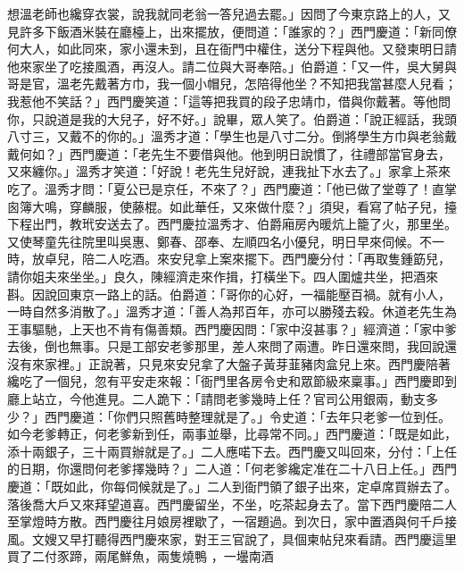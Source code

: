 想溫老師也纔穿衣裳，說我就同老翁一答兒過去罷。」因問了今東京路上的人，又見許多下飯酒米裝在廳檯上，出來擺放，便問道：「誰家的？」西門慶道：「新同僚何大人，如此同來，家小還未到，且在衙門中權住，送分下程與他。又發柬明日請他來家坐了吃接風酒，再沒人。請二位與大哥奉陪。」伯爵道：「又一件，吳大舅與哥是官，溫老先戴著方巾，我一個小帽兒，怎陪得他坐？不知把我當甚麼人兒看；我惹他不笑話？」西門慶笑道：「這等把我買的段子忠靖巾，借與你戴著。等他問你，只說道是我的大兒子，好不好。」說畢，眾人笑了。伯爵道：「說正經話，我頭八寸三，又戴不的你的。」溫秀才道：「學生也是八寸二分。倒將學生方巾與老翁戴戴何如？」西門慶道：「老先生不要借與他。他到明日說慣了，往禮部當官身去，又來纏你。」溫秀才笑道：「好說！老先生兒好說，連我扯下水去了。」家拿上茶來吃了。溫秀才問：「夏公已是京任，不來了？」西門慶道：「他已做了堂尊了！直掌囪簿大鳴，穿麟服，使藤棍。如此華任，又來做什麼？」須臾，看寫了帖子兒，擡下程出門，教玳安送去了。西門慶拉溫秀才、伯爵廂房內暖炕上籠了火，那里坐。又使琴童先往院里叫吳惠、鄭春、邵奉、左順四名小優兒，明日早來伺候。不一時，放卓兒，陪二人吃酒。來安兒拿上案來擺下。西門慶分付：「再取隻鍾筯兒，請你姐夫來坐坐。」良久，陳經濟走來作揖，打橫坐下。四人圍爐共坐，把酒來斟。因說回東京一路上的話。伯爵道：「哥你的心好，一福能壓百禍。就有小人，一時自然多消散了。」溫秀才道：「善人為邦百年，亦可以勝殘去殺。休道老先生為王事驅馳，上天也不肯有傷善類。西門慶因問：「家中沒甚事？」經濟道：「家中爹去後，倒也無事。只是工部安老爹那里，差人來問了兩遭。昨日還來問，我回說還沒有來家裡。」正說著，只見來安兒拿了大盤子黃芽韮豬肉盒兒上來。西門慶陪著纔吃了一個兒，忽有平安走來報：「衙門里各房令史和眾節級來稟事。」西門慶即到廳上站立，今他進見。二人跪下：「請問老爹幾時上任？官司公用銀兩，動支多少？」西門慶道：「你們只照舊時整理就是了。」令史道：「去年只老爹一位到任。如今老爹轉正，何老爹新到任，兩事並舉，比尋常不同。」西門慶道：「既是如此，添十兩銀子，三十兩買辦就是了。」二人應喏下去。西門慶又叫回來，分付：「上任的日期，你還問何老爹擇幾時？」二人道：「何老爹纔定准在二十八日上任。」西門慶道：「既如此，你每伺候就是了。」二人到衙門領了銀子出來，定卓席買辦去了。落後喬大戶又來拜望道喜。西門慶留坐，不坐，吃茶起身去了。當下西門慶陪二人至掌燈時方散。西門慶往月娘房裡歇了，一宿題過。到次日，家中置酒與何千戶接風。文嫂又早打聽得西門慶來家，對王三官說了，具個柬帖兒來看請。西門慶這里買了二付豕蹄，兩尾鮮魚，兩隻燒鴨 ，一壜南酒 